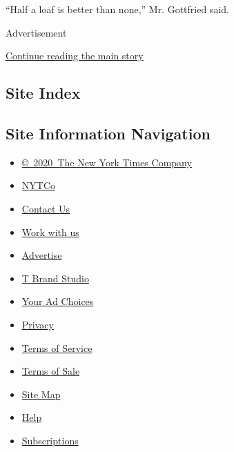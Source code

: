``Half a loaf is better than none,'' Mr. Gottfried said.

Advertisement

\protect\hyperlink{after-bottom}{Continue reading the main story}

\hypertarget{site-index}{%
\subsection{Site Index}\label{site-index}}

\hypertarget{site-information-navigation}{%
\subsection{Site Information
Navigation}\label{site-information-navigation}}

\begin{itemize}
\tightlist
\item
  \href{https://help.nytimes.com/hc/en-us/articles/115014792127-Copyright-notice}{©~2020~The
  New York Times Company}
\end{itemize}

\begin{itemize}
\tightlist
\item
  \href{https://www.nytco.com/}{NYTCo}
\item
  \href{https://help.nytimes.com/hc/en-us/articles/115015385887-Contact-Us}{Contact
  Us}
\item
  \href{https://www.nytco.com/careers/}{Work with us}
\item
  \href{https://nytmediakit.com/}{Advertise}
\item
  \href{http://www.tbrandstudio.com/}{T Brand Studio}
\item
  \href{https://www.nytimes.com/privacy/cookie-policy\#how-do-i-manage-trackers}{Your
  Ad Choices}
\item
  \href{https://www.nytimes.com/privacy}{Privacy}
\item
  \href{https://help.nytimes.com/hc/en-us/articles/115014893428-Terms-of-service}{Terms
  of Service}
\item
  \href{https://help.nytimes.com/hc/en-us/articles/115014893968-Terms-of-sale}{Terms
  of Sale}
\item
  \href{https://spiderbites.nytimes.com}{Site Map}
\item
  \href{https://help.nytimes.com/hc/en-us}{Help}
\item
  \href{https://www.nytimes.com/subscription?campaignId=37WXW}{Subscriptions}
\end{itemize}
